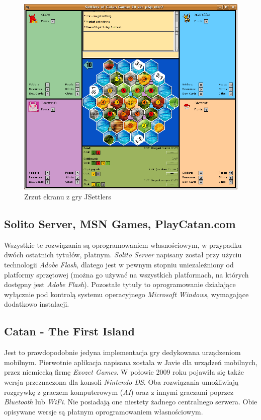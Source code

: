 \documentclass[a4paper,12pt]{article}
\begin{document}
\begin{figure}[ht]
  \begin{center}
    \includegraphics[width=\linewidth]{jsettlers.png}
  \end{center}
  \caption{Zrzut ekranu z gry JSettlers}
  \label{jsettlers}
\end{figure}

\subsection{Solito Server, MSN Games, PlayCatan.com}
Wszystkie te rozwiązania są oprogramowaniem własnościowym, w przypadku
dwóch ostatnich tytułów, płatnym. \emph{Solito Server} napisany został
przy użyciu technologii \emph{Adobe Flash}, dlatego jest w pewnym
stopniu uniezależniony od platformy sprzętowej (można go używać na
wszystkich platformach, na których dostępny jest \emph{Adobe
  Flash}). Pozostałe tytuły to oprogramowanie działające wyłącznie pod
kontrolą systemu operacyjnego \emph{Microsoft Windows}, wymagające
dodatkowo instalacji.

\subsection{Catan - The First Island}
Jest to prawdopodobnie jedyna implementacja gry dedykowana urządzeniom
mobilnym. Pierwotnie aplikacja napisana została w Javie dla urządzeń
mobilnych, przez niemiecką firmę \emph{Exozet Games}. W połowie 2009
roku pojawiła się także wersja przeznaczona dla konsoli \emph{Nintendo
  DS}. Oba rozwiązania umożliwiają rozgrywkę z graczem komputerowym
(\emph{AI}) oraz z innymi graczami poprzez \emph{Bluetooth} lub
\emph{WiFi}. Nie posiadają one niestety żadnego centralnego
serwera. Obie opisywane wersje są płatnym oprogramowaniem
własnościowym.
\end{document}
